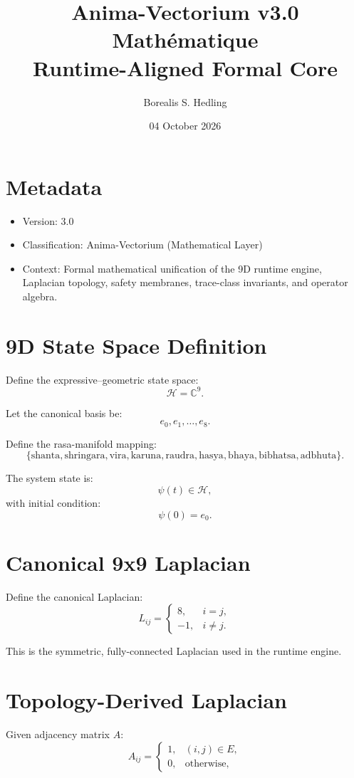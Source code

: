 \documentclass[12pt]{article}
\title{Anima-Vectorium v3.0 Mathématique \\ \large Runtime-Aligned Formal Core}
\author{Borealis S. Hedling}
\date{04 October 2026}
\begin{document}
\maketitle

\section*{Metadata}
\begin{itemize}
    \item Version: 3.0
    \item Classification: Anima-Vectorium (Mathematical Layer)
    \item Context: Formal mathematical unification of the 9D runtime engine, Laplacian topology,
          safety membranes, trace-class invariants, and operator algebra.
\end{itemize}

\section{9D State Space Definition}

Define the expressive--geometric state space:
\[
\mathcal{H} = \mathbb{C}^9.
\]

Let the canonical basis be:
\[
e_0, e_1, \dots, e_8.
\]

Define the rasa-manifold mapping:
\[
\{ \text{shanta}, \text{shringara}, \text{vira}, \text{karuna}, \text{raudra},
   \text{hasya}, \text{bhaya}, \text{bibhatsa}, \text{adbhuta} \}.
\]

The system state is:
\[
\psi(t) \in \mathcal{H},
\]
with initial condition:
\[
\psi(0) = e_0.
\]

\section{Canonical 9x9 Laplacian}

Define the canonical Laplacian:
\[
L_{ij} =
\begin{cases}
8, & i = j, \\
-1, & i \neq j.
\end{cases}
\]

This is the symmetric, fully-connected Laplacian used in the runtime engine.

\section{Topology-Derived Laplacian}

Given adjacency matrix $A$:
\[
A_{ij} =
\begin{cases}
1, & (i,j) \in E, \\
0, & \text{otherwise},
\end{cases}
\]
\end{document}
